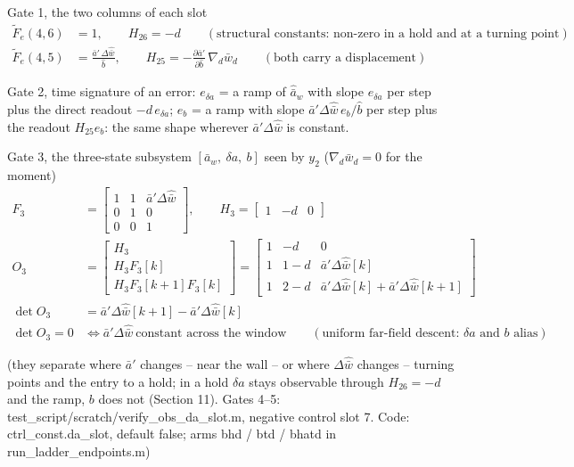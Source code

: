 \documentclass[11pt,a4paper,fontset=none]{ctexart}
\newcommand{\ba}{\bar{a}}
\newcommand{\bw}{\bar{w}}
\newcommand{\dWh}{\Delta\hat{\bw}}
\newcommand{\ap}{\ba'}
\begin{document}
Gate 1, the two columns of each slot
\begin{align*}
\tilde F_e(4,6) &= 1 , \qquad H_{26} = -d \qquad (\text{structural constants: non-zero in a hold and at a turning point}) \\
\tilde F_e(4,5) &= \frac{\ap\,\dWh}{\hat b} , \qquad H_{25} = -\frac{\partial\ap}{\partial\hat b}\,\nabla_d\bw_d \qquad (\text{both carry a displacement})
\end{align*}

Gate 2, time signature of an error: $e_{\delta a}$ = a ramp of $\hat{\ba}_w$ with slope $e_{\delta a}$ per step plus the direct readout $-d\,e_{\delta a}$;
$e_b$ = a ramp with slope $\ap\dWh\,e_b/\hat b$ per step plus the readout $H_{25}e_b$: the same shape wherever $\ap\dWh$ is constant.

Gate 3, the three-state subsystem $[\ba_w,\ \delta a,\ b]$ seen by $y_2$ ($\nabla_d\bw_d = 0$ for the moment)
\begin{align*}
F_3 &= \begin{bmatrix} 1 & 1 & \ap\dWh \\ 0 & 1 & 0 \\ 0 & 0 & 1 \end{bmatrix} , \qquad
H_3 = \begin{bmatrix} 1 & -d & 0 \end{bmatrix} \\
O_3 &= \begin{bmatrix} H_3 \\ H_3 F_3[k] \\ H_3 F_3[k+1] F_3[k] \end{bmatrix}
   = \begin{bmatrix} 1 & -d & 0 \\ 1 & 1-d & \ap\dWh[k] \\ 1 & 2-d & \ap\dWh[k] + \ap\dWh[k+1] \end{bmatrix} \\
\det O_3 &= \ap\dWh[k+1] - \ap\dWh[k] \\
\det O_3 = 0 &\iff \ap\dWh \ \text{constant across the window} \qquad (\text{uniform far-field descent: } \delta a \text{ and } b \text{ alias})
\end{align*}

(they separate where $\ap$ changes -- near the wall -- or where $\dWh$ changes -- turning points and the entry to a hold; in a hold
$\delta a$ stays observable through $H_{26} = -d$ and the ramp, $b$ does not (Section 11). Gates 4--5: test\_script/scratch/verify\_obs\_da\_slot.m,
negative control slot 7. Code: ctrl\_const.da\_slot, default false; arms bhd / btd / bhatd in run\_ladder\_endpoints.m)
\end{document}
